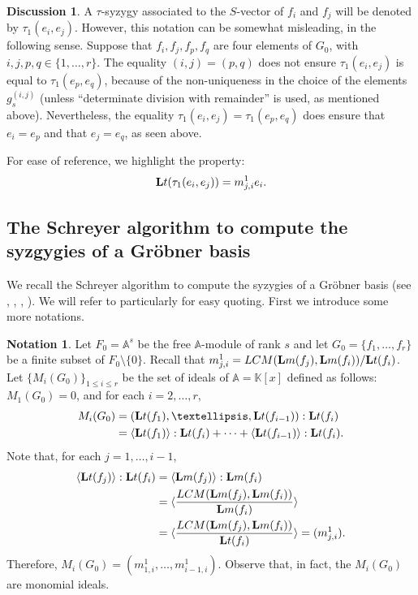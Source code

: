 \documentclass[10pt]{amsart}
\newcommand{\mbk}{\mbox{$\mathbb{K}$}}
\newcommand{\mba}{\mbox{$\mathbb{A}$}}
\newcommand{\lm}{\mbox{${\bf L}{\rm m}$}}
\newcommand{\lt}{\mbox{${\bf L}{\rm t}$}}
\newcommand{\Lcm}{\mbox{${\rm LCM}$}}
\theoremstyle{definition}
\newtheorem{notation}[cdrthm]{Notation}
\newtheorem{discussion}[cdrthm]{Discussion}
\theoremstyle{remark}
\begin{document}
\begin{discussion}
A $\tau$-syzygy associated to the $S$-vector of $f_i$ and $f_j$ will
be denoted by $\tau_1(e_i,e_j)$. However, this notation can be
somewhat misleading, in the following sense. Suppose that
$f_{i},f_{j},f_{p},f_{q}$ are four elements of $G_0$, with
$i,j,p,q\in\{1,\ldots ,r\}$. The equality $(i,j)=(p,q)$ does not
ensure $\tau_1(e_i,e_j)$ is equal to $\tau_1(e_p,e_q)$, because of the
non-uniqueness in the choice of the elements $g_s^{(i,j)}$ (unless
``determinate division with remainder'' is used, as mentioned
above). Nevertheless, the equality $\tau_1(e_i,e_j)=\tau_1(e_p,e_q)$
does ensure that $e_i=e_p$ and that $e_j=e_q$, as seen above.

For ease of reference, we highlight the property:
\begin{eqnarray}\label{inducedlm}
\lt(\tau_1(e_i,e_j))=m^1_{j,i}e_i.
\end{eqnarray}
\end{discussion}

\subsection{The Schreyer algorithm to compute
the syzgygies of a Gr\"obner basis}\label{schreyer-alg}

 We recall the Schreyer algorithm to compute the syzygies of
a Gr\"obner basis (see \cite[Theorem~3.2 and Proposition~3.5]{emss},
\cite[Corollary~2.3.19]{ds}, \cite[Corollary~1.11]{bs},
\cite[Theorem~15.10, Corollary~15.11]{eisenbud}).  We will refer to
\cite{emss} particularly for easy quoting. First we introduce some more
notations.

\begin{notation}\label{module-quotients}
Let $F_0=\mba^s$ be the free $\mba$-module of rank $s$ and let
$G_0=\{f_1,\ldots ,f_r\}$ be a finite subset of
$F_0\setminus\{0\}$. Recall that
$m^1_{j,i}=\Lcm(\lm(f_j),\lm(f_i))/\lt(f_i)$.  Let
$\{M_i(G_0)\}_{1\leq i\leq r}$ be the set of ideals of $\mba=\mbk[x]$
defined as follows: $M_1(G_0)=0$, and for each $i=2,\ldots,r$,
\begin{align*}
M_i(G_0)&=(\lt(f_1),\ldots,\lt(f_{i-1})):\lt(f_i)\\
&=  \langle\lt(f_1)\rangle:\lt(f_i)+\cdots+\langle\lt(f_{i-1})\rangle:\lt(f_i).
\end{align*}
Note that, for each $j=1,\ldots, i-1$,
\begin{align*}
\langle \lt(f_j)\rangle: \lt(f_i)&=\langle
  \lm(f_j)\rangle:\lm(f_i)\\
&=\langle  \frac{\Lcm(\lm(f_j),\lm(f_i))}{\lm(f_i)}\rangle\\
&= \langle \frac{\Lcm(\lm(f_j),\lm(f_i))}{\lt(f_i)}\rangle=(m^1_{j,i}).
\end{align*}
Therefore, $M_i(G_0)=(m^1_{1,i},\ldots , m^1_{i-1,i})$. Observe that,
in fact, the $M_i(G_0)$ are monomial ideals.
\end{notation}
\end{document}
